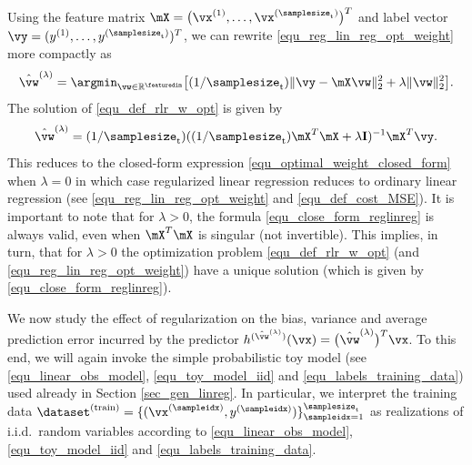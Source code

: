 \documentclass[12pt]{report}
\begin{document}
Using the feature matrix $\mX=\big(\vx^{(1)},\ldots,\vx^{(\samplesize_{\rm t})}\big)^{T}$ and label vector $\vy=(y^{(1)},\ldots,y^{(\samplesize_{\rm t})})^{T}$, 
we can rewrite \eqref{equ_reg_lin_reg_opt_weight} more compactly as 
\begin{equation} 
\label{equ_def_rlr_w_opt}
\hat{\vw}^{(\lambda)} = \argmin_{\vw \in \mathbb{R}^{\featuredim}} \big[ (1/\samplesize_{\rm t}) \| \vy - \mX \vw \|^{2}_{2} + \lambda \| \vw \|^{2}_{2}\big].
\end{equation} 
The solution of \eqref{equ_def_rlr_w_opt} is given by 
\begin{equation}
\label{equ_close_form_reglinreg}
\hat{\vw}^{(\lambda)} = (1/\samplesize_{\rm t}) ((1/\samplesize_{\rm t}) \mX^{T} \mX + \lambda \mathbf{I})^{-1} \mX^{T} \vy. 
\end{equation}
This reduces to the closed-form expression \eqref{equ_optimal_weight_closed_form} 
when $\lambda=0$ in which case regularized linear regression reduces to ordinary linear 
regression (see \eqref{equ_reg_lin_reg_opt_weight} and \eqref{equ_def_cost_MSE}). It 
is important to note that for $\lambda>0$, the formula \eqref{equ_close_form_reglinreg} 
is always valid, even when $\mX^{T} \mX$ is singular (not invertible). This implies, in turn, 
that for $\lambda> 0$ the optimization problem \eqref{equ_def_rlr_w_opt} (and \eqref{equ_reg_lin_reg_opt_weight}) 
have a unique solution (which is given by \eqref{equ_close_form_reglinreg}). 

We now study the effect of regularization on the bias, variance 
and average prediction error incurred by the predictor $h^{(\hat{\vw}^{(\lambda)})}(\vx) = \big(\hat{\vw}^{(\lambda)}\big)^{T} \vx$. 
To this end, we will again invoke the simple probabilistic toy 
model (see \eqref{equ_linear_obs_model}, \eqref{equ_toy_model_iid} 
and \eqref{equ_labels_training_data}) used already in Section \ref{sec_gen_linreg}. 
In particular, we interpret the training data $\dataset^{(\rm train)} = \{ (\vx^{(\sampleidx)},y^{(\sampleidx)}) \}_{\sampleidx=1}^{\samplesize_{\rm t}}$ 
as realizations of i.i.d.\ random variables according to \eqref{equ_linear_obs_model}, 
\eqref{equ_toy_model_iid} and \eqref{equ_labels_training_data}. 
\end{document}
